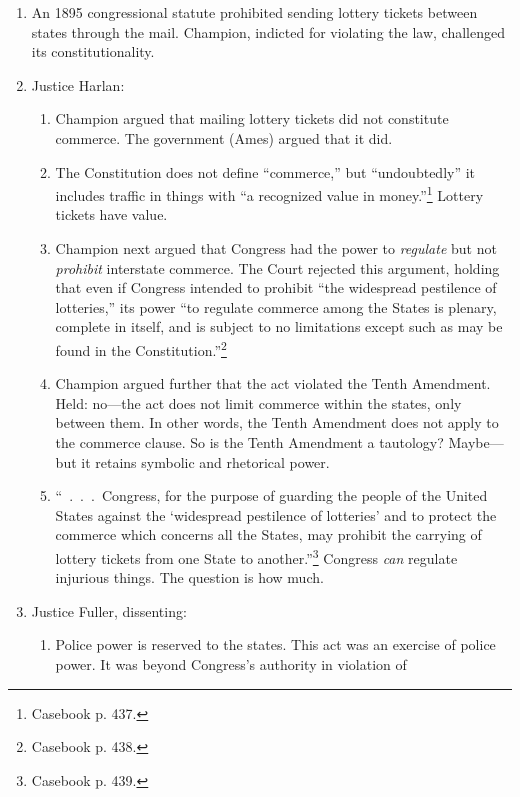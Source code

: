 \begin{enumerate}
    \item An 1895 congressional statute prohibited sending lottery tickets 
    between states through the mail. Champion, indicted for violating the law, 
    challenged its constitutionality.
    \item Justice Harlan:
    \begin{enumerate}
        \item Champion argued that mailing lottery tickets did not 
        constitute commerce. The government (Ames) argued that it did.
        \item The Constitution does not define ``commerce,'' but 
        ``undoubtedly'' it includes traffic in things with ``a recognized 
        value in money.''\footnote{Casebook p. 437.} Lottery tickets have 
        value.
        \item Champion next argued that Congress had the power to 
        \emph{regulate} but not \emph{prohibit} interstate commerce. The Court 
        rejected this argument, holding that even if Congress intended to 
        prohibit ``the widespread pestilence of lotteries,'' its power ``to 
        regulate commerce among the States is plenary, complete in itself, and 
        is subject to no limitations except such as may be found in the 
        Constitution.''\footnote{Casebook p. 438.}
        \item Champion argued further that the act violated the Tenth 
        Amendment. Held: no---the act does not limit commerce within the 
        states, only between them. In other words, the Tenth Amendment does 
        not apply to the commerce clause. So is the Tenth Amendment a 
        tautology? Maybe---but it retains symbolic and rhetorical power.
        \item ``~.~.~.~Congress, for the purpose of guarding the people of the 
        United States against the `widespread pestilence of lotteries' and to 
        protect the commerce which concerns all the States, may prohibit the 
        carrying of lottery tickets from one State to 
        another.''\footnote{Casebook p. 439.} Congress \emph{can} regulate 
        injurious things. The question is how much.
    \end{enumerate}
    \item Justice Fuller, dissenting:
    \begin{enumerate}
        \item Police power is reserved to the states. This act was an exercise 
        of police power. It was beyond Congress's authority in violation of 

\end{enumerate}
\end{enumerate}

